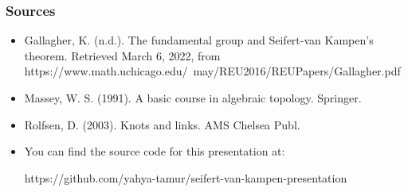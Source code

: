 \documentclass[8pt]{beamer}
\begin{document}
  \begin{frame}
    \frametitle{Sources}
      \begin{itemize}
        \item Gallagher, K. (n.d.). The fundamental group and Seifert-van Kampen’s
          theorem. Retrieved March 6, 2022, from https://www.math.uchicago.edu/~may/REU2016/REUPapers/Gallagher.pdf 
        \item Massey, W. S. (1991). A basic course in algebraic topology. Springer. 
        \item Rolfsen, D. (2003). Knots and links. AMS Chelsea Publ. 

        \item You can find the source code for this presentation at:

          https://github.com/yahya-tamur/seifert-van-kampen-presentation
      \end{itemize}
  \end{frame}
\end{document}

